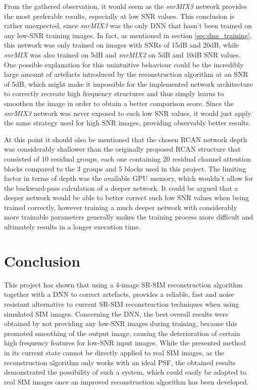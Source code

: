 \documentclass[conference]{IEEEtran}
\begin{document}
From the gathered observation, it would seem as the \textit{snrMIX3} network provides the most preferable results, especially at low SNR values. This conclusion is rather unexpected, since \textit{snrMIX3} was the only DNN that hasn't been trained on any low-SNR training images. In fact, as mentioned in section \ref{sec:dnn_training}, this network was only trained on images with SNRs of 15dB and 20dB, while \textit{snrMIX} was also trained on 5dB and \textit{snrMIX2} on 5dB and 10dB SNR values. One possible explanation for this unintuitive behaviour could be the incredibly large amount of artefacts introduced by the reconstruction algorithm at an SNR of 5dB, which might make it impossible for the implemented network architecture to correctly recreate high frequency structures and thus simply learns to smoothen the image in order to obtain a better comparison score. Since the \textit{snrMIX3} network was never exposed to such low SNR values, it would just apply the same strategy used for high SNR images, providing observably better results.

At this point it should also be mentioned that the chosen RCAN network depth was considerably shallower than the originally proposed RCAN structure that consisted of 10 residual groups, each one containing 20 residual channel attention blocks \cite{zhang2018rcan} compared to the 3 groups and 5 blocks used in this project. The limiting factor in terms of depth was the available GPU memory, which wouldn't allow for the backward-pass calculation of a deeper network. It could be argued that a deeper network would be able to better correct such low SNR values when being trained correctly, however training a much deeper network with considerably more trainable parameters generally makes the training process more difficult and ultimately results in a longer execution time.

\section{Conclusion}
This project has shown that using a 4-image SR-SIM reconstruction algorithm together with a DNN to correct artefacts, provides a reliable, fast and noise resistant alternative to current SR-SIM reconstruction techniques when using simulated SIM images. Concerning the DNN, the best overall results were obtained by not providing any low-SNR images during training, because this promoted smoothing of the output image, causing the 
deterioration of certain high frequency features for low-SNR input images. While the presented method in its current state cannot be directly applied to real SIM images, as the reconstruction algorithm only works with an ideal PSF, the obtained results demonstrated the possibility of such a system, which could easily be adapted to real SIM images once an improved reconstruction algorithm has been developed.
\end{document}

